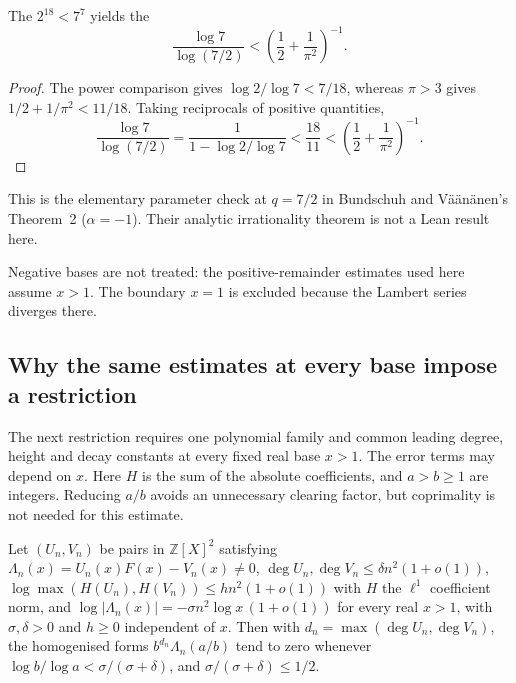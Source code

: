 \documentclass[11pt]{article}
\begin{document}
\begin{theorem}\label{res:sevenhalves}
The
$2^{18}<7^7$ yields the
\[
 \frac{\log 7}{\log(7/2)}
 <
 \left(\frac12+\frac1{\pi^2}\right)^{-1}.
\]
\end{theorem}
\begin{proof}
The power comparison gives $\log2/\log7<7/18$, whereas $\pi>3$
gives $1/2+1/\pi^2<11/18$. Taking reciprocals of positive quantities,
\[
 \frac{\log7}{\log(7/2)}
 =\frac1{1-\log2/\log7}<\frac{18}{11}
 <\left(\frac12+\frac1{\pi^2}\right)^{-1}.
\]
\end{proof}
\noindent This is the elementary parameter check at $q=7/2$ in Bundschuh and
V\"a\"an\"anen's Theorem~2 ($\alpha=-1$).  Their analytic irrationality
theorem is not a Lean result here.

Negative bases are not treated: the positive-remainder estimates used here
assume $x>1$. The boundary $x=1$ is excluded because the Lambert series
diverges there.

\subsection{Why the same estimates at every base impose a restriction}
The next restriction requires one polynomial family and common leading
degree, height and decay constants at every fixed real base $x>1$.
The error terms may depend on $x$. Here $H$ is the sum of the absolute
coefficients, and $a>b\ge1$ are integers. Reducing $a/b$ avoids an
unnecessary clearing factor, but coprimality is not needed for this estimate.

\begin{sloppypar}
\begin{theorem}
\label{res:archimedean-cap}
Let $(U_n,V_n)$ be pairs in $\mathbb Z[X]^2$ satisfying $\Lambda_n(x)=U_n(x)F(x)-V_n(x)\ne0$,
$\deg U_n,\deg V_n\le\delta n^2(1+o(1))$,
$\log\max(H(U_n),H(V_n))\le h n^2(1+o(1))$ with $H$ the $\ell^1$ coefficient
norm, and
$\log|\Lambda_n(x)|=-\sigma n^2\log x\,(1+o(1))$ for every real $x>1$, with
$\sigma,\delta>0$ and $h\ge0$ independent of $x$.  Then with
$d_n=\max(\deg U_n,\deg V_n)$, the homogenised forms
$b^{d_n}\Lambda_n(a/b)$ tend to zero whenever
$\log b/\log a<\sigma/(\sigma+\delta)$, and $\sigma/(\sigma+\delta)\le1/2$.
\end{theorem}
\end{sloppypar}
\end{document}
